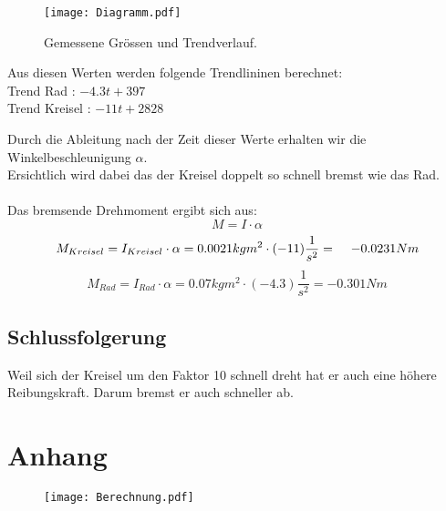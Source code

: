 \documentclass{article}
\begin{document}
\begin{figure}[H]
\texttt{[image: Diagramm.pdf]} 
\caption{Gemessene Grössen und Trendverlauf.}
\end{figure}
Aus diesen Werten werden folgende Trendlininen berechnet:\\
Trend Rad : \hspace{2cm}$-4.3t+397 $\\
Trend Kreisel : \hspace{1.58cm}$-11t+2828$

Durch die Ableitung nach der Zeit dieser Werte erhalten wir die Winkelbeschleunigung $\alpha$.\\
Ersichtlich wird dabei das der Kreisel doppelt so schnell bremst wie das Rad.\\\\
Das bremsende Drehmoment ergibt sich aus: 
\begin{equation}
M=I\cdot \alpha
\end{equation}
\begin{equation}
M_{Kreisel} = I_{Kreisel}\cdot \alpha = 0.0021kgm^2 \cdot (-11)\frac{1}{s^2} = \hspace{0.4cm}-0.0231Nm\\
\end{equation}
\begin{equation}
M_{Rad} = I_{Rad}\cdot \alpha= 0.07kgm^2 \cdot (-4.3)\frac{1}{s^2}  =  -0.301Nm
\end{equation}




\subsection{Schlussfolgerung}
Weil sich der Kreisel um den Faktor 10 schnell dreht hat er auch eine höhere Reibungskraft. Darum bremst er auch schneller ab.
\newpage
\section{Anhang}

\begin{figure}[H]
\texttt{[image: Berechnung.pdf]} 
\label{Anhang}
\end{figure} 
\end{document}
